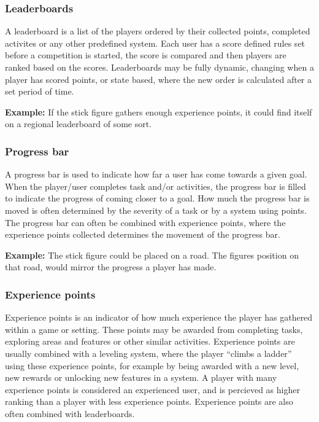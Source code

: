 \subsubsection{Leaderboards}
A leaderboard is a list of the players ordered by their collected points, completed activites or any other predefined system. Each user has a score defined rules set before a competition is started, the score is compared and then players are ranked based on the scores. Leaderboards may be fully dynamic, changing when a player has scored points, or state based, where the new order is calculated after a set period of time.

\textbf{Example:} If the stick figure gathers enough experience points, it could find itself on a regional leaderboard of some sort. 

\subsubsection{Progress bar}
A progress bar is used to indicate how far a user has come towards a given goal. When the player/user completes task and/or activities, the progress bar is filled to indicate the progress of coming closer to a goal. How much the progress bar is moved is often determined by the severity of a task or by a system using points. The progress bar can often be combined with experience points, where the experience points collected determines the movement of the progress bar. 

\textbf{Example:} The stick figure could be placed on a road. The figures position on that road, would mirror the progress a player has made. 

\subsubsection{Experience points}
Experience points is an indicator of how much experience the player has gathered within a game or setting. These points may be awarded from completing tasks, exploring areas and features or other similar activities. Experience points are usually combined with a leveling system, where the player ``climbs a ladder'' using these experience points, for example by being awarded with a new level, new rewards or unlocking new features in a system. A player with many experience points is considered an experienced user, and is percieved as higher ranking than a player with less experience points. Experience points are also often combined with leaderboards. 

